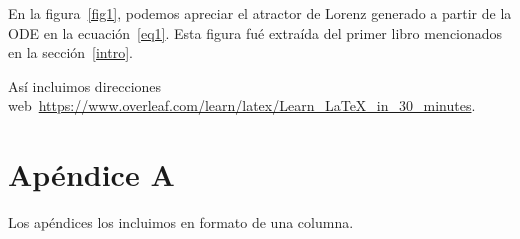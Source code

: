 \documentclass[aps,prl,twocolumn,groupedaddress]{revtex4-2}
\begin{document}
En la figura~\ref{fig1}, podemos apreciar el atractor de Lorenz generado a partir de la ODE en la ecuación~\ref{eq1}.
Esta figura fué extraída del primer libro mencionados en la sección~\ref{intro}.

Así incluimos direcciones web~\url{https://www.overleaf.com/learn/latex/Learn_LaTeX_in_30_minutes}.



\onecolumngrid
\appendix

\section{Apéndice A}
\label{appA}

Los apéndices los incluimos en formato de una columna.
\end{document}
